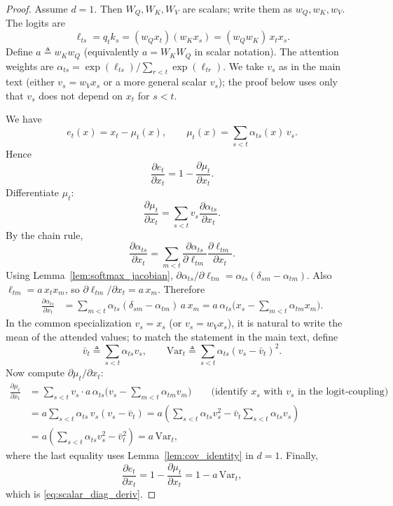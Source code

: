 \documentclass[11pt]{article}
\begin{document}
\begin{proof}
Assume $d=1$. Then $W_Q,W_K,W_V$ are scalars; write them as $w_Q,w_K,w_V$.
The logits are
\[
\ell_{ts}=q_t k_s=(w_Q x_t)(w_K x_s)=(w_Q w_K)\,x_t x_s.
\]
Define $a\triangleq w_K w_Q$ (equivalently $a=W_KW_Q$ in scalar notation).
The attention weights are $\alpha_{ts}=\exp(\ell_{ts})/\sum_{r<t}\exp(\ell_{tr})$.
We take $v_s$ as in the main text (either $v_s=w_V x_s$ or a more general scalar $v_s$); the proof below
uses only that $v_s$ does not depend on $x_t$ for $s<t$.

We have
\[
e_t(x)=x_t-\mu_t(x),\qquad \mu_t(x)=\sum_{s<t}\alpha_{ts}(x)\,v_s.
\]
Hence
\[
\frac{\partial e_t}{\partial x_t} = 1-\frac{\partial \mu_t}{\partial x_t}.
\]
Differentiate $\mu_t$:
\[
\frac{\partial \mu_t}{\partial x_t}
=
\sum_{s<t} v_s \frac{\partial \alpha_{ts}}{\partial x_t}.
\]
By the chain rule,
\[
\frac{\partial \alpha_{ts}}{\partial x_t}
=
\sum_{m<t} \frac{\partial \alpha_{ts}}{\partial \ell_{tm}}
\frac{\partial \ell_{tm}}{\partial x_t}.
\]
Using Lemma~\ref{lem:softmax_jacobian},
$\partial \alpha_{ts}/\partial \ell_{tm}=\alpha_{ts}(\delta_{sm}-\alpha_{tm})$.
Also $\ell_{tm}=a\,x_t x_m$, so $\partial \ell_{tm}/\partial x_t = a\,x_m$.
Therefore
\begin{align}
\frac{\partial \alpha_{ts}}{\partial x_t}
&=
\sum_{m<t} \alpha_{ts}(\delta_{sm}-\alpha_{tm})\,a\,x_m
=
a\,\alpha_{ts}\Big(x_s-\sum_{m<t}\alpha_{tm}x_m\Big).
\end{align}
In the common specialization $v_s=x_s$ (or $v_s=w_V x_s$), it is natural to write the mean of the
attended values; to match the statement in the main text, define
\[
\bar v_t \triangleq \sum_{s<t}\alpha_{ts} v_s,
\qquad
\mathrm{Var}_t \triangleq \sum_{s<t}\alpha_{ts}(v_s-\bar v_t)^2.
\]
Now compute $\partial \mu_t/\partial x_t$:
\begin{align}
\frac{\partial \mu_t}{\partial x_t}
&=
\sum_{s<t} v_s \cdot a\,\alpha_{ts}\Big(v_s-\sum_{m<t}\alpha_{tm}v_m\Big)
\qquad\text{(identify $x_s$ with $v_s$ in the logit-coupling)} \nonumber\\
&=
a\sum_{s<t}\alpha_{ts}\,v_s(v_s-\bar v_t)
=
a\left(\sum_{s<t}\alpha_{ts}v_s^2-\bar v_t\sum_{s<t}\alpha_{ts}v_s\right)\nonumber\\
&=
a\left(\sum_{s<t}\alpha_{ts}v_s^2-\bar v_t^2\right)
=
a\,\mathrm{Var}_t,
\label{eq:scalar_mu_derivative}
\end{align}
where the last equality uses Lemma~\ref{lem:cov_identity} in $d=1$.
Finally,
\[
\frac{\partial e_t}{\partial x_t}
=
1-\frac{\partial \mu_t}{\partial x_t}
=
1-a\,\mathrm{Var}_t,
\]
which is \eqref{eq:scalar_diag_deriv}.
\end{proof}
\end{document}
